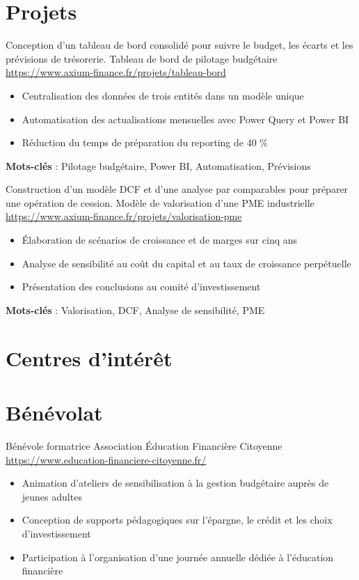 \documentclass[a4paper, serif, 10pt]{moderncv}
\begin{document}
\section{Projets}

        {Conception d'un tableau de bord consolidé pour suivre le budget, les écarts et les prévisions de trésorerie.}
        {Tableau de bord de pilotage budgétaire}
        {\url{https://www.axium-finance.fr/projets/tableau-bord}}
        {}
        {\begin{itemize}
\item Centralisation des données de trois entités dans un modèle unique
\item Automatisation des actualisations mensuelles avec Power Query et Power BI
\item Réduction du temps de préparation du reporting de 40 \%
\end{itemize}
\textbf{Mots-clés} : Pilotage budgétaire, Power BI, Automatisation, Prévisions}

        {Construction d'un modèle DCF et d'une analyse par comparables pour préparer une opération de cession.}
        {Modèle de valorisation d'une PME industrielle}
        {\url{https://www.axium-finance.fr/projets/valorisation-pme}}
        {}
        {\begin{itemize}
\item Élaboration de scénarios de croissance et de marges sur cinq ans
\item Analyse de sensibilité au coût du capital et au taux de croissance perpétuelle
\item Présentation des conclusions au comité d'investissement
\end{itemize}
\textbf{Mots-clés} : Valorisation, DCF, Analyse de sensibilité, PME}
\section{Centres d'intérêt}

\section{Bénévolat}

        {Bénévole formatrice}
        {Association Éducation Financière Citoyenne}
        {\url{https://www.education-financiere-citoyenne.fr/}}
        {}
        {\begin{itemize}
\item Animation d'ateliers de sensibilisation à la gestion budgétaire auprès de jeunes adultes
\item Conception de supports pédagogiques sur l'épargne, le crédit et les choix d'investissement
\item Participation à l'organisation d'une journée annuelle dédiée à l'éducation financière
\end{itemize}}
    
\end{document}
